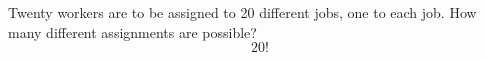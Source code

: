 \item Twenty workers are to be assigned to 20 different jobs, one to each job. How many different assignments are possible?
\[ 20! \]